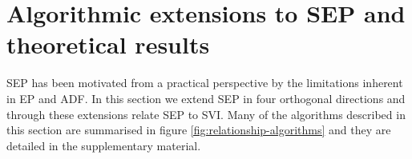 \section{Algorithmic extensions to SEP and theoretical results}
%
SEP has been motivated from a practical perspective by the limitations inherent in EP and ADF. In this section we extend SEP in four orthogonal directions and through these extensions relate SEP to SVI. Many of the algorithms described in this section are summarised in figure \ref{fig:relationship-algorithms} and they are detailed in the supplementary material.


%
